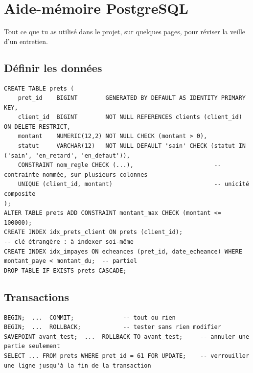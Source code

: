 \chapter{Aide-mémoire PostgreSQL}

Tout ce que tu as utilisé dans le projet, sur quelques pages, pour réviser la veille d'un entretien.

\section{Définir les données}
\begin{lstlisting}[style=long]
CREATE TABLE prets (
    pret_id    BIGINT        GENERATED BY DEFAULT AS IDENTITY PRIMARY KEY,
    client_id  BIGINT        NOT NULL REFERENCES clients (client_id) ON DELETE RESTRICT,
    montant    NUMERIC(12,2) NOT NULL CHECK (montant > 0),
    statut     VARCHAR(12)   NOT NULL DEFAULT 'sain' CHECK (statut IN ('sain', 'en_retard', 'en_defaut')),
    CONSTRAINT nom_regle CHECK (...),                       -- contrainte nommée, sur plusieurs colonnes
    UNIQUE (client_id, montant)                             -- unicité composite
);
ALTER TABLE prets ADD CONSTRAINT montant_max CHECK (montant <= 100000);
CREATE INDEX idx_prets_client ON prets (client_id);                       -- clé étrangère : à indexer soi-même
CREATE INDEX idx_impayes ON echeances (pret_id, date_echeance) WHERE montant_paye < montant_du;  -- partiel
DROP TABLE IF EXISTS prets CASCADE;
\end{lstlisting}

\section{Transactions}
\begin{lstlisting}[style=long]
BEGIN;  ...  COMMIT;              -- tout ou rien
BEGIN;  ...  ROLLBACK;            -- tester sans rien modifier
SAVEPOINT avant_test;  ...  ROLLBACK TO avant_test;     -- annuler une partie seulement
SELECT ... FROM prets WHERE pret_id = 61 FOR UPDATE;    -- verrouiller une ligne jusqu'à la fin de la transaction
\end{lstlisting}

